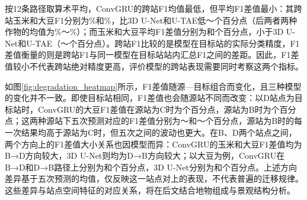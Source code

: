 按12条路径取算术平均，ConvGRU的跨站F1均值最低，但平均F1差值最小：其跨站玉米和大豆F1分别为\FConvCrossCorn{}\%和\FConvCrossSoy{}\%，比3D U-Net和U-TAE低\FCrossModelGapMin{}～\FCrossModelGapMax{}个百分点（后两者两种作物的均值为\FOtherCrossMin{}\%～\FOtherCrossMax{}\%）；而玉米和大豆平均F1差值分别为\FConvGapCorn{}和\FConvGapSoy{}个百分点，小于3D U-Net和U-TAE（\FOtherGapMin{}～\FOtherGapMax{}个百分点）。跨站F1比较的是模型在目标站的实际分类精度，F1差值衡量的则是跨站F1与同一模型在目标站站内汇总F1之间的差距。因此，F1差值较小不代表跨站绝对精度更高，评价模型的跨站表现需要同时考察这两个指标。


如图\ref{fig:degradation_heatmap}所示，F1差值随源—目标组合而变化，且三种模型的变化并不一致。即使目标站相同，F1差值也会随源站不同而改变：以D站点为目标站时，ConvGRU的大豆F1差值在源站为C时为\FConvSoyCD{}个百分点，源站为B时为\FConvSoyBD{}个百分点；这两种源站下五次预测对应的F1差值分别为\FConvSoyCDRunMin{}～\FConvSoyCDRunMax{}和\FConvSoyBDRunMin{}～\FConvSoyBDRunMax{}个百分点，源站为B时的每一次结果均高于源站为C时，但五次之间的波动也更大。在B、D两个站点之间，两个方向上的F1差值大小关系也因模型而异：ConvGRU的玉米和大豆F1差值均为B→D方向较大，3D U-Net则均为D→B方向较大；以大豆为例，ConvGRU在B→D和D→B路径上分别为\FConvSoyBD{}和\FConvSoyDB{}个百分点，3D U-Net分别为\FUnetSoyBD{}和\FUnetSoyDB{}个百分点。上述方向差异基于五次预测的均值，仅反映这一站点对上的表现，不代表普遍的迁移规律。这些差异与站点空间特征的对应关系，将在后文结合地物组成与景观结构分析。

